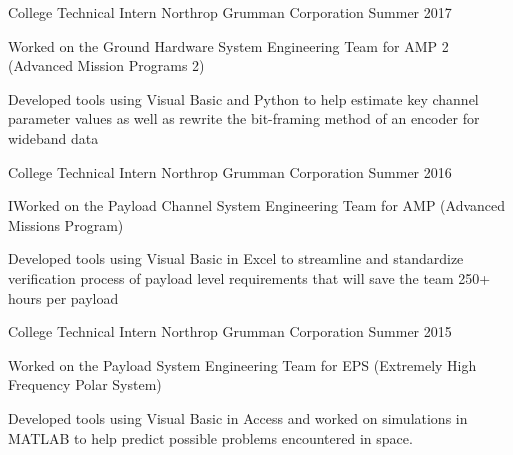 \vspace{-2mm}
\vspace{-2mm}


\begin{cventries}
  \cventry
    {College Technical Intern} %
    {Northrop Grumman Corporation} %
    {Summer 2017} %
    {} %
    {
      \begin{cvitems} %
        \item {Worked on the Ground Hardware System Engineering Team for AMP 2 (Advanced Mission Programs 2)}
        \item {Developed tools using Visual Basic and Python to help estimate key channel parameter values as well as rewrite the bit-framing method of an encoder for wideband data}
      \end{cvitems}
    }


  \cventry
    {College Technical Intern} %
    {Northrop Grumman Corporation} %
    {Summer 2016} %
    {} %
    {
      \begin{cvitems} %
        \item {IWorked on the Payload Channel System Engineering Team for AMP (Advanced Missions Program)}
        \item {Developed tools using Visual Basic in Excel to streamline and standardize verification process of payload level requirements that will save the team 250+ hours per payload}
      \end{cvitems}
    }

  \cventry
    {College Technical Intern} %
    {Northrop Grumman Corporation} %
    {Summer 2015} %
    {} %
    {
      \begin{cvitems} %
        \item {Worked on the Payload System Engineering Team for EPS (Extremely High Frequency Polar System)}
        \item {Developed tools using Visual Basic in Access and worked on simulations in MATLAB to help predict possible problems encountered in space.}
      \end{cvitems}
    }


\end{cventries}
